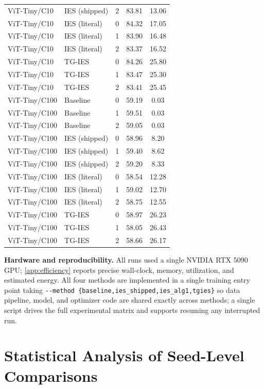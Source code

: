 \documentclass{article}
\newcommand{\win}[1]{\cellcolor{tgwin}#1}
\newcommand{\lose}[1]{\cellcolor{tglose}#1}
\theoremstyle{plain}
\theoremstyle{definition}
\theoremstyle{remark}
\begin{document}
\begin{longtable}{llccc}
ViT-Tiny/C10 & IES (shipped) & 2 & 83.81 & 13.06 \\
ViT-Tiny/C10 & IES (literal) & 0 & 84.32 & 17.05 \\
ViT-Tiny/C10 & IES (literal) & 1 & 83.90 & 16.48 \\
ViT-Tiny/C10 & IES (literal) & 2 & 83.37 & 16.52 \\
ViT-Tiny/C10 & TG-IES & 0 & \lose{84.26} & \win{25.80} \\
ViT-Tiny/C10 & TG-IES & 1 & \lose{83.47} & \win{25.30} \\
ViT-Tiny/C10 & TG-IES & 2 & \lose{83.41} & \win{25.45} \\
ViT-Tiny/C100 & Baseline & 0 & 59.19 & 0.03 \\
ViT-Tiny/C100 & Baseline & 1 & 59.51 & 0.03 \\
ViT-Tiny/C100 & Baseline & 2 & 59.05 & 0.03 \\
ViT-Tiny/C100 & IES (shipped) & 0 & 58.96 & 8.20 \\
ViT-Tiny/C100 & IES (shipped) & 1 & 59.40 & 8.62 \\
ViT-Tiny/C100 & IES (shipped) & 2 & 59.20 & 8.33 \\
ViT-Tiny/C100 & IES (literal) & 0 & 58.54 & 12.28 \\
ViT-Tiny/C100 & IES (literal) & 1 & 59.02 & 12.70 \\
ViT-Tiny/C100 & IES (literal) & 2 & 58.75 & 12.55 \\
ViT-Tiny/C100 & TG-IES & 0 & \lose{58.97} & \win{26.23} \\
ViT-Tiny/C100 & TG-IES & 1 & \lose{58.05} & \win{26.43} \\
ViT-Tiny/C100 & TG-IES & 2 & \lose{58.66} & \win{26.17} \\
\end{longtable}
\endgroup

\textbf{Hardware and reproducibility.} All runs used a single NVIDIA RTX 5090 GPU; \cref{app:efficiency} reports precise wall-clock, memory, utilization, and estimated energy. All four methods are implemented in a single training entry point taking \texttt{-{}-method \{baseline,ies\_shipped,ies\_alg1,tgies\}} so data pipeline, model, and optimizer code are shared exactly across methods; a single script drives the full experimental matrix and supports resuming any interrupted run.

\section{Statistical Analysis of Seed-Level Comparisons}
\label{app:stats}
\end{document}
